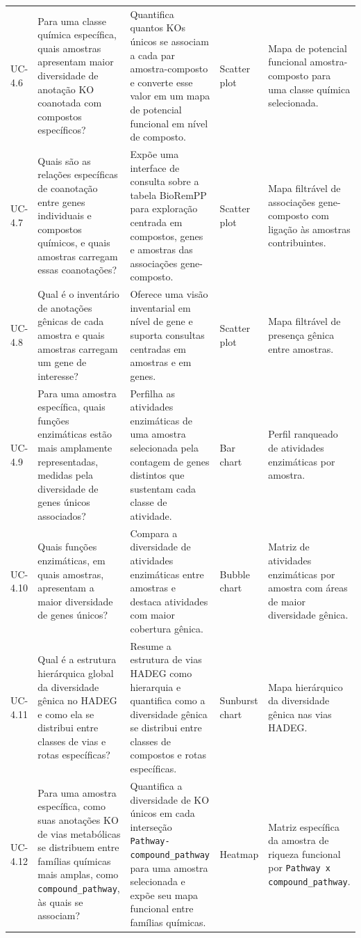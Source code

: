 \begin{landscape}
\begin{longtable}{>{\raggedright\arraybackslash}p{1.1cm} >{\raggedright\arraybackslash}p{5.0cm} >{\raggedright\arraybackslash}p{7.8cm} >{\raggedright\arraybackslash}p{4.2cm} >{\raggedright\arraybackslash}p{5.3cm}}
UC-4.6 & Para uma classe química específica, quais amostras apresentam maior diversidade de anotação KO coanotada com compostos específicos? & Quantifica quantos KOs únicos se associam a cada par amostra-composto e converte esse valor em um mapa de potencial funcional em nível de composto. & Scatter plot & Mapa de potencial funcional amostra-composto para uma classe química selecionada. \\
UC-4.7 & Quais são as relações específicas de coanotação entre genes individuais e compostos químicos, e quais amostras carregam essas coanotações? & Expõe uma interface de consulta sobre a tabela BioRemPP para exploração centrada em compostos, genes e amostras das associações gene-composto. & Scatter plot & Mapa filtrável de associações gene-composto com ligação às amostras contribuintes. \\
UC-4.8 & Qual é o inventário de anotações gênicas de cada amostra e quais amostras carregam um gene de interesse? & Oferece uma visão inventarial em nível de gene e suporta consultas centradas em amostras e em genes. & Scatter plot & Mapa filtrável de presença gênica entre amostras. \\
UC-4.9 & Para uma amostra específica, quais funções enzimáticas estão mais amplamente representadas, medidas pela diversidade de genes únicos associados? & Perfilha as atividades enzimáticas de uma amostra selecionada pela contagem de genes distintos que sustentam cada classe de atividade. & Bar chart & Perfil ranqueado de atividades enzimáticas por amostra. \\
UC-4.10 & Quais funções enzimáticas, em quais amostras, apresentam a maior diversidade de genes únicos? & Compara a diversidade de atividades enzimáticas entre amostras e destaca atividades com maior cobertura gênica. & Bubble chart & Matriz de atividades enzimáticas por amostra com áreas de maior diversidade gênica. \\
UC-4.11 & Qual é a estrutura hierárquica global da diversidade gênica no HADEG e como ela se distribui entre classes de vias e rotas específicas? & Resume a estrutura de vias HADEG como hierarquia e quantifica como a diversidade gênica se distribui entre classes de compostos e rotas específicas. & Sunburst chart & Mapa hierárquico da diversidade gênica nas vias HADEG. \\
UC-4.12 & Para uma amostra específica, como suas anotações KO de vias metabólicas se distribuem entre famílias químicas mais amplas, como \texttt{compound\_pathway}, às quais se associam? & Quantifica a diversidade de KO únicos em cada interseção \texttt{Pathway-compound\_pathway} para uma amostra selecionada e expõe seu mapa funcional entre famílias químicas. & Heatmap & Matriz específica da amostra de riqueza funcional por \texttt{Pathway x compound\_pathway}. \\

\end{longtable}
\end{landscape}
